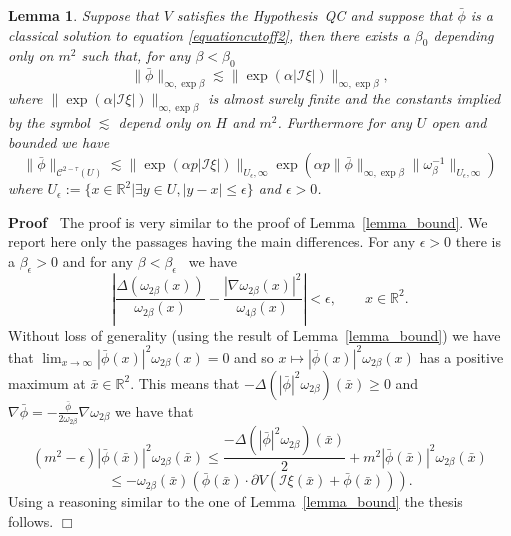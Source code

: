 \documentclass[a4paper,10pt]{article}
\newcommand{\assign}{:=}
\newenvironment{proof}{\noindent\textbf{Proof\ }}{\hspace*{\fill}$\Box$\medskip}
\newtheorem{lemma}[theorem]{Lemma}
\begin{document}
\begin{lemma}
  \label{lemma_existencecutoff}Suppose that $V$ satisfies the Hypothesis~QC
  and suppose that $\bar{\phi}$ is a classical solution to equation
  {\eqref{equationcutoff2}}, then there exists a $\beta_0$ depending only on
  $m^2$ such that, for any $\beta < \beta_0$
  \begin{equation}
    \| \bar{\phi} \|_{\infty, \exp \beta} \lesssim \| \exp (\alpha |
    \mathcal{I} \xi |) \|_{\infty, \exp \beta}, \label{equationweight1}
  \end{equation}
  where $\| \exp (\alpha | \mathcal{I} \xi |) \|_{\infty, \exp \beta}$ is
  almost surely finite and the constants implied by the symbol $\lesssim$
  depend only on $H$ and $m^2$. Furthermore for any $U$ open and bounded we
  have
  \begin{equation}
    \| \bar{\phi} \|_{\mathcal{C}^{2 - \tau} (U)} \lesssim \| \exp (\alpha p |
    \mathcal{I} \xi |) \|_{U_{\epsilon}, \infty} \exp (\alpha p \| \bar{\phi}
    \|_{\infty, \exp \beta} \| \omega_{\beta}^{- 1} \|_{U_{\epsilon}, \infty})
    \label{equationweight2}
  \end{equation}
  where $U_{\epsilon} \assign \{ x \in \mathbb{R}^2 | \exists y \in U, | y - x
  | \leqslant \epsilon \}$ and $\epsilon > 0$.
\end{lemma}

\begin{proof}
  The proof is very similar to the proof of Lemma~\ref{lemma_bound}. We report
  here only the passages having the main differences. For any $\epsilon > 0$
  there is a $\beta_{\epsilon} > 0$ and for any $\beta < \beta_{\epsilon}$ \
  we have
  \[ \left| \frac{\Delta (\omega_{2 \beta} (x))}{\omega_{2 \beta} (x)} -
     \frac{| \nabla \omega_{2 \beta} (x) |^2}{\omega_{4 \beta} (x)} \right| <
     \epsilon, \qquad x \in \mathbb{R}^2 . \]
  Without loss of generality (using the result of Lemma~\ref{lemma_bound}) we
  have that $\lim_{x \rightarrow \infty} | \bar{\phi} (x) |^2 \omega_{2 \beta}
  (x) = 0$ and so $x \mapsto | \bar{\phi} (x) |^2 \omega_{2 \beta} (x)$ has a
  positive maximum at $\bar{x} \in \mathbb{R}^2 .$ This means that $- \Delta
  (| \bar{\phi} |^2 \omega_{2 \beta}) (\bar{x}) \geqslant 0$ and $\nabla
  \bar{\phi} = - \frac{\bar{\phi}}{2 \omega_{2 \beta}} \nabla \omega_{2
  \beta}$ we have that
  \[ (m^2 - \epsilon) | \bar{\phi} (\bar{x}) |^2 \omega_{2 \beta} (\bar{x})
     \leqslant \frac{- \Delta (| \bar{\phi} |^2 \omega_{2 \beta})
     (\bar{x})}{2} + m^2 | \bar{\phi} (\bar{x}) |^2 \omega_{2 \beta} (\bar{x})
  \]
  \[ \leqslant - \omega_{2 \beta} (\bar{x}) (\bar{\phi} (\bar{x}) \cdot
     \partial V (\mathcal{I} \xi (\bar{x}) + \bar{\phi} (\bar{x}))) . \]
  Using a reasoning similar to the one of Lemma~\ref{lemma_bound} the thesis
  follows.
\end{proof}
\end{document}
